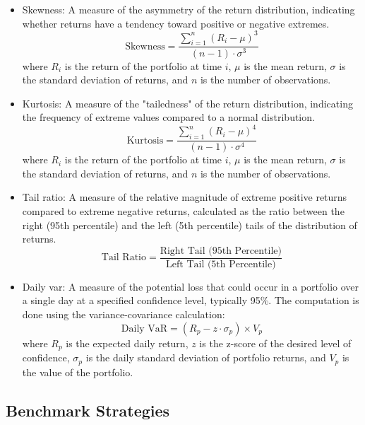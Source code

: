 \begin{itemize}
    \item Skewness: A measure of the asymmetry of the return distribution, indicating whether returns have a tendency toward positive or negative extremes.
    \begin{equation}
        \text{Skewness} = \frac{\sum_{i=1}^{n} (R_i - \mu)^3}{(n-1) \cdot \sigma^3}
    \end{equation}
    where $R_i$ is the return of the portfolio at time $i$, $\mu$ is the mean return, $\sigma$ is the standard deviation of returns, and $n$ is the number of observations.
    \item Kurtosis: A measure of the "tailedness" of the return distribution, indicating the frequency of extreme values compared to a normal distribution. 
    \begin{equation}
        \text{Kurtosis} = \frac{\sum_{i=1}^{n} (R_i - \mu)^4}{(n-1) \cdot \sigma^4}
    \end{equation}
    where $R_i$ is the return of the portfolio at time $i$, $\mu$ is the mean return, $\sigma$ is the standard deviation of returns, and $n$ is the number of observations.
    \item Tail ratio: A measure of the relative magnitude of extreme positive returns compared to extreme negative returns, calculated as the ratio between the right (95th percentile) and the left (5th percentile) tails of the distribution of returns. 
    \begin{equation}
        \text{Tail Ratio} = \frac{\text{Right Tail (95th Percentile)}}{\text{Left Tail (5th Percentile)}}
    \end{equation}
    \item Daily \acrfull{var}: A measure of the potential loss that could occur in a portfolio over a single day at a specified confidence level, typically 95\%. The computation is done using the variance-covariance calculation:
    \begin{equation}
        \text{Daily VaR} = \left(R_p - z \cdot \sigma_p \right) \times V_p
    \end{equation}
    where $R_p$ is the expected daily return, $z$ is the z-score of the desired level of confidence, $\sigma_p$ is the daily standard deviation of portfolio returns, and $V_p$ is the value of the portfolio.
\end{itemize}

\subsection{Benchmark Strategies} \label{sec:benchmark-strategies}

